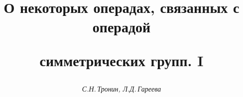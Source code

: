 \newcommand{\la}{\lambda}


\renewcommand{\o}{\omega}


\newcommand{\fb}{{\bold f}}


\newcommand{\tn}{\otimes}


\newcommand{\T}{{\frak T}}


\newcommand{\C}{{\frak C}}


\newcommand{\f}{\varphi}


\newcommand{\p}{\psi}


\newcommand{\A}{{\frak A}}


\newcommand{\tts}[1]{}


\renewcommand{\baselinestretch}{1.03}










\setcounter{page}{61}















\author{\it С.Н.\,Тронин, Л.Д.\,Гареева}




\title{О некоторых операдах, связанных с операдой 


симметрических групп. I}





\date{}




\pagestyle{plain} %







\maketitle


\label{begin}














